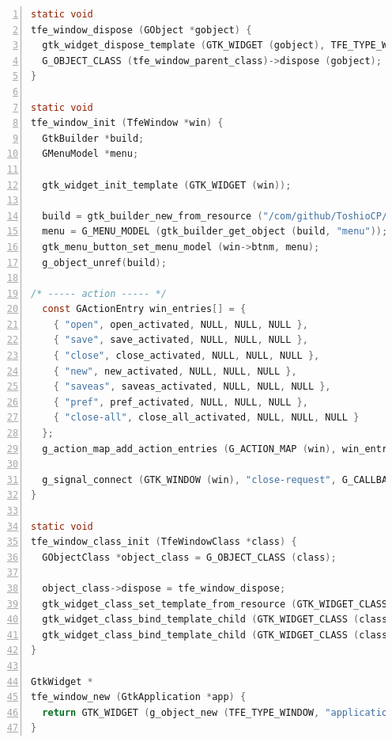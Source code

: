 \begin{lstlisting}[language=C, numbers=left]
static void
tfe_window_dispose (GObject *gobject) {
  gtk_widget_dispose_template (GTK_WIDGET (gobject), TFE_TYPE_WINDOW);
  G_OBJECT_CLASS (tfe_window_parent_class)->dispose (gobject);
}

static void
tfe_window_init (TfeWindow *win) {
  GtkBuilder *build;
  GMenuModel *menu;

  gtk_widget_init_template (GTK_WIDGET (win));

  build = gtk_builder_new_from_resource ("/com/github/ToshioCP/tfe/menu.ui");
  menu = G_MENU_MODEL (gtk_builder_get_object (build, "menu"));
  gtk_menu_button_set_menu_model (win->btnm, menu);
  g_object_unref(build);

/* ----- action ----- */
  const GActionEntry win_entries[] = {
    { "open", open_activated, NULL, NULL, NULL },
    { "save", save_activated, NULL, NULL, NULL },
    { "close", close_activated, NULL, NULL, NULL },
    { "new", new_activated, NULL, NULL, NULL },
    { "saveas", saveas_activated, NULL, NULL, NULL },
    { "pref", pref_activated, NULL, NULL, NULL },
    { "close-all", close_all_activated, NULL, NULL, NULL }
  };
  g_action_map_add_action_entries (G_ACTION_MAP (win), win_entries, G_N_ELEMENTS (win_entries), win);

  g_signal_connect (GTK_WINDOW (win), "close-request", G_CALLBACK (close_request_cb), NULL);
}

static void
tfe_window_class_init (TfeWindowClass *class) {
  GObjectClass *object_class = G_OBJECT_CLASS (class);

  object_class->dispose = tfe_window_dispose;
  gtk_widget_class_set_template_from_resource (GTK_WIDGET_CLASS (class), "/com/github/ToshioCP/tfe/tfewindow.ui");
  gtk_widget_class_bind_template_child (GTK_WIDGET_CLASS (class), TfeWindow, btnm);
  gtk_widget_class_bind_template_child (GTK_WIDGET_CLASS (class), TfeWindow, nb);
}

GtkWidget *
tfe_window_new (GtkApplication *app) {
  return GTK_WIDGET (g_object_new (TFE_TYPE_WINDOW, "application", app, NULL));
}
\end{lstlisting}
